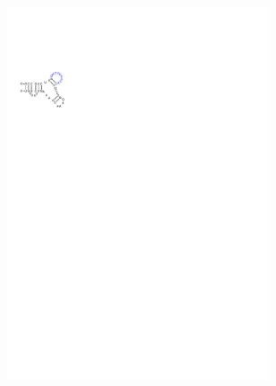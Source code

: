 \begin{figure}[H]
\begin{subfigure}{0.3\textwidth}
    \includegraphics[clip, trim=0 21cm 15cm 2.5cm, width=0.85\textwidth]{../img/alg/insert/2/multibranch-del}
    \caption{}
    \label{obr:delete_insert_multibranch_stem_b}
  \end{subfigure}
  \begin{subfigure}{0.3\textwidth}

\end{subfigure}
\end{figure}
